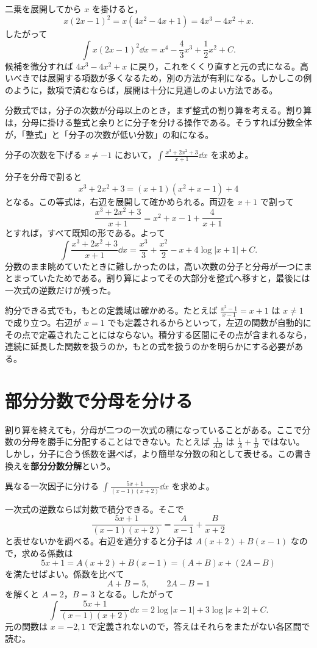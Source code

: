 二乗を展開してから $x$ を掛けると，
\[
 x(2x-1)^2=x(4x^2-4x+1)=4x^3-4x^2+x.
\]
したがって
\[
 \int x(2x-1)^2\dd x
 =x^4-\frac43x^3+\frac12x^2+C.
\]
候補を微分すれば $4x^3-4x^2+x$ に戻り，これをくくり直すと元の式になる。高いべきでは展開する項数が多くなるため，別の方法が有利になる。しかしこの例のように，数項で済むならば，展開は十分に見通しのよい方法である。

分数式では，分子の次数が分母以上のとき，まず整式の割り算を考える。割り算は，分母に掛ける整式と余りとに分子を分ける操作である。そうすれば分数全体が，「整式」と「分子の次数が低い分数」の和になる。

\begin{example}{分子の次数を下げる}
$x\ne-1$ において，$\int\frac{x^3+2x^2+3}{x+1}\dd x$ を求めよ。
\end{example}

分子を分母で割ると
\[
 x^3+2x^2+3=(x+1)(x^2+x-1)+4
\]
となる。この等式は，右辺を展開して確かめられる。両辺を $x+1$ で割って
\[
 \frac{x^3+2x^2+3}{x+1}
 =x^2+x-1+\frac4{x+1}
\]
とすれば，すべて既知の形である。よって
\[
 \int\frac{x^3+2x^2+3}{x+1}\dd x
 =\frac{x^3}{3}+\frac{x^2}{2}-x+4\log|x+1|+C.
\]
分数のまま眺めていたときに難しかったのは，高い次数の分子と分母が一つにまとまっていたためである。割り算によってその大部分を整式へ移すと，最後には一次式の逆数だけが残った。

約分できる式でも，もとの定義域は確かめる。たとえば $\frac{x^2-1}{x-1}=x+1$ は $x\ne1$ で成り立つ。右辺が $x=1$ でも定義されるからといって，左辺の関数が自動的にその点で定義されたことにはならない。積分する区間にその点が含まれるなら，連続に延長した関数を扱うのか，もとの式を扱うのかを明らかにする必要がある。

\section{部分分数で分母を分ける}\label{節:部分分数}

割り算を終えても，分母が二つの一次式の積になっていることがある。ここで分数の分母を勝手に分配することはできない。たとえば $\frac1{AB}$ は $\frac1A+\frac1B$ ではない。しかし，分子に合う係数を選べば，より簡単な分数の和として表せる。この書き換えを\textbf{部分分数分解}という。

\begin{example}{異なる一次因子に分ける}
$\int\frac{5x+1}{(x-1)(x+2)}\dd x$ を求めよ。
\end{example}

一次式の逆数ならば対数で積分できる。そこで
\[
 \frac{5x+1}{(x-1)(x+2)}
 =\frac A{x-1}+\frac B{x+2}
\]
と表せないかを調べる。右辺を通分すると分子は $A(x+2)+B(x-1)$ なので，求める係数は
\[
 5x+1=A(x+2)+B(x-1)
       =(A+B)x+(2A-B)
\]
を満たせばよい。係数を比べて
\[
 A+B=5,\qquad 2A-B=1
\]
を解くと $A=2$，$B=3$ となる。したがって
\[
 \int\frac{5x+1}{(x-1)(x+2)}\dd x
 =2\log|x-1|+3\log|x+2|+C.
\]
元の関数は $x=-2,1$ で定義されないので，答えはそれらをまたがない各区間で読む。

